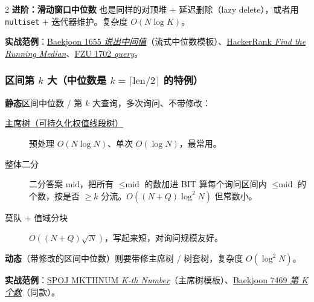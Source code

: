 \begin{multicols*}{2}
		\textbf{进阶：滑动窗口中位数} 也是同样的对顶堆 + 延迟删除（lazy delete），或者用 \texttt{multiset} + 迭代器维护。复杂度 $O(N \log K)$。

		\textbf{实战范例}：\href{https://vjudge.net/problem/Baekjoon-1655}{Baekjoon 1655 \emph{说出中间值}}（流式中位数模板）、\href{https://vjudge.net/problem/HackerRank-find-the-running-median}{HackerRank \emph{Find the Running Median}}、\href{https://vjudge.net/problem/FZU-1702}{FZU 1702 \emph{query}}。

		\subsubsection{区间第 $k$ 大（中位数是 $k = \lceil \text{len}/2 \rceil$ 的特例）}

		\textbf{静态}区间中位数 / 第 $k$ 大查询，多次询问、不带修改：

		\begin{description}
			\item[\href{https://oi-wiki.org/ds/persistent-seg/}{主席树（可持久化权值线段树）}] 预处理 $O(N \log N)$、单次 $O(\log N)$，最常用。
			\item[整体二分] 二分答案 $\text{mid}$，把所有 $\le \text{mid}$ 的数加进 BIT 算每个询问区间内 $\le \text{mid}$ 的个数，按是否 $\ge k$ 分流。$O((N + Q) \log^2 N)$ 但常数小。
			\item[莫队 + 值域分块] $O((N + Q) \sqrt N)$，写起来短，对询问规模友好。
		\end{description}

		\textbf{动态}（带修改的区间中位数）则要带修主席树 / 树套树，复杂度 $O(\log^2 N)$。

		\textbf{实战范例}：\href{https://vjudge.net/problem/SPOJ-MKTHNUM}{SPOJ MKTHNUM \emph{K-th Number}}（主席树模板）、\href{https://vjudge.net/problem/Baekjoon-7469}{Baekjoon 7469 \emph{第 K 个数}}（同款）。


\end{multicols*}
